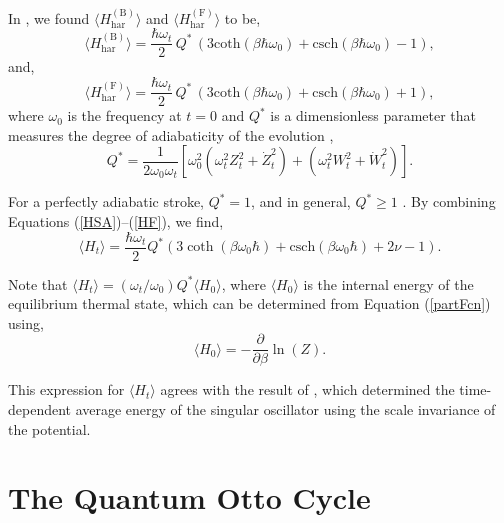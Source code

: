 \documentclass[preprints,article,accept,moreauthors,pdftex]{Definitions/mdpi}
\begin{document}
In \cite{Myers2020}, we found $\langle H_{\mathrm{har}}^{(\mathrm{B})} \rangle$ and $\langle H_{\mathrm{har}}^{(\mathrm{F})} \rangle$ to be,
\begin{equation}
	\label{HB}
	\langle H_{\mathrm{har}}^{(\mathrm{B})} \rangle = \frac{\hbar \omega_t}{2}\, Q^*\, \left( 3 \mathrm{coth}(\beta \hbar \omega_0) + \mathrm{csch}(\beta \hbar \omega_0) - 1 \right),
\end{equation}
and,
\begin{equation}
	\label{HF}
	\langle H_{\mathrm{har}}^{(\mathrm{F})} \rangle = \frac{\hbar \omega_t}{2}\, Q^*\, \left( 3 \mathrm{coth}(\beta \hbar \omega_0) + \mathrm{csch}(\beta \hbar \omega_0) + 1 \right),
\end{equation}
where {$\omega_0$ is the frequency at $t = 0$ and} $Q^*$ is a dimensionless parameter that measures the degree of adiabaticity of the evolution \cite{Husimi1953},
\begin{equation}
	Q^*= \frac{1}{2 \omega_0 \omega_t}\left[\omega^{2}_0\left(\omega^{2}_t Z_t^2 + \dot{Z}_t^2\right)+\left(\omega^{2}_t W_t^2+\dot{W}_t^2\right)\right].
\end{equation} 

For a perfectly adiabatic stroke, $Q^* = 1$, and in general, $Q^* \geq 1$ \cite{Husimi1953, Abah2012}. By combining Equations (\ref{HSA})--(\ref{HF}), we find,
\begin{equation}
	\label{tdependE}
	\langle H_t \rangle = \frac{\hbar  \omega_t}{2} Q^* \left(3 \coth \left(\beta  \omega_0 \hbar \right)+\text{csch}\left(\beta  \omega_0 \hbar \right)+2 \nu -1\right).
\end{equation}

Note that $\langle H_t \rangle = (\omega_t/\omega_0)Q^* \langle H_0 \rangle$, where $\langle H_0 \rangle$ is the internal energy of the equilibrium thermal state, which can be determined from Equation (\ref{partFcn}) using,
\begin{equation}
	\langle H_0 \rangle = - \frac{\partial }{\partial \beta} \ln(Z).
\end{equation}

This expression for $\langle H_t \rangle$ agrees with the result of \cite{Jaramillo2016}, which determined the time-dependent average energy of the singular oscillator using the scale invariance of the potential.                       
          
\section{The Quantum Otto Cycle}
\end{document}
